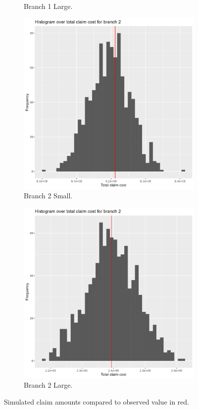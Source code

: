 \documentclass[11pt]{article}
\begin{document}
\begin{figure}[!h]
\begin{subfigure}{.24\textwidth}
      \caption{Branch 1 Large.}
    \end{subfigure}
    \begin{subfigure}{.24\textwidth}
      \centering
      \includegraphics[width=.9\linewidth]{plots/simulation/histogram_total_claim_cost_small2.png}
      \caption{Branch 2 Small.}
    \end{subfigure}%
    \begin{subfigure}{.24\textwidth}
      \centering
      \includegraphics[width=.9\linewidth]{plots/simulation/histogram_total_claim_cost_large2.png}
      \caption{Branch 2 Large.}
    \end{subfigure}
    \caption{Simulated claim amounts compared to observed value in red.}
    \label{a4:claim_cost1}
\end{figure}
\end{document}
